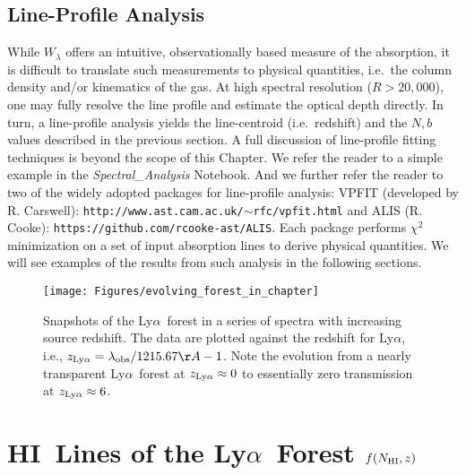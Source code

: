\documentclass[graybox]{svmult}
\newcommand{\HI}{H{\sc I}}
\def\lya{Ly$\alpha$}
\newcommand{\mnhi}{N_{\rm HI}}
\begin{document}
\subsection{Line-Profile Analysis}
\label{sec:line_fitting}

While $W_\lambda$ offers an intuitive, observationally based
measure of the absorption, it is difficult to translate
such measurements to physical quantities, i.e.\ the column
density and/or kinematics of the gas.  At high spectral
resolution ($R > 20,000$), one may fully resolve
the line profile and estimate the optical depth directly.
In turn, a line-profile analysis yields the line-centroid
(i.e.\ redshift) and the $N,b$ values described in the
previous section.
A full discussion of line-profile fitting techniques is
beyond the scope of this Chapter.  We refer the reader
to a simple example in the {\it Spectral\_Analysis} Notebook.
And we further refer the reader to two of the widely adopted
packages for line-profile analysis:
VPFIT (developed by R. Carswell):  
{\tt http://www.ast.cam.ac.uk/$\sim$rfc/vpfit.html}
and ALIS (R. Cooke): {\tt https://github.com/rcooke-ast/ALIS}.
Each package performs $\chi^2$ minimization on a set of
input absorption lines to derive physical quantities.
We will see examples of the results from such analysis in the
following sections.


\begin{figure}[ht]
\sidecaption
\texttt{[image: Figures/evolving\_forest\_in\_chapter]}
%
%
\caption{Snapshots of the \lya\ forest in a series of spectra
with increasing source redshift.  
The data are plotted against the redshift for \lya, 
i.e., $z_{\rm Ly\alpha} = \lambda_{\rm obs}/1215.67\AA -1 $.
Note the evolution from a nearly
transparent \lya\ forest at $z_{\rm Ly \alpha} \approx 0$ to essentially 
zero transmission at $z_{\rm Ly \alpha} \approx 6$.
}
\label{fig:lyf_z}       %
\end{figure}

\clearpage

\section{\HI\ Lines of the \lya\ Forest $f(\mnhi,z)$}
\end{document}
